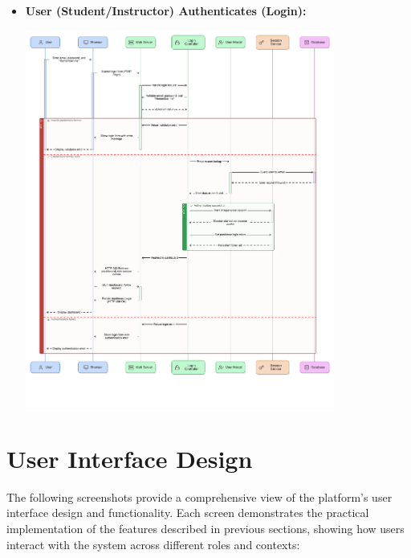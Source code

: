 \documentclass[12pt,a4paper]{article}
\begin{document}
\begin{itemize}
\begin{center}
        \label{fig:instructor-grades-submission}
        \end{center}
    \clearpage
    \item \textbf{User (Student/Instructor) Authenticates (Login):}
    \begin{center}       
        \includegraphics[width=0.8\textwidth,height=0.85\textheight,keepaspectratio]{user-authentication.png}
        \label{fig:user-authentication}
        \end{center}
        \FloatBarrier
    \clearpage
\end{itemize}

\section{User Interface Design}

\label{sec:ui-design}

The following screenshots provide a comprehensive view of the platform's user interface design and functionality. Each screen demonstrates the practical implementation of the features described in previous sections, showing how users interact with the system across different roles and contexts:
\end{document}
